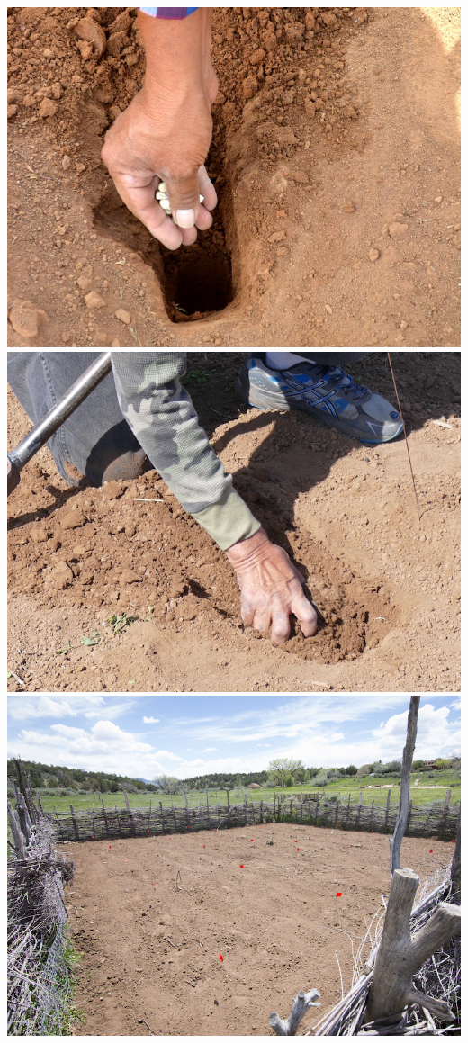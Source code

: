 \documentclass[12pt,]{article}
\begin{document}
\includegraphics{./images/planting/6_planting.jpg}
\includegraphics{./images/planting/7_planting.jpg}
\includegraphics{./images/planting/8_planting.jpg}
\end{document}
